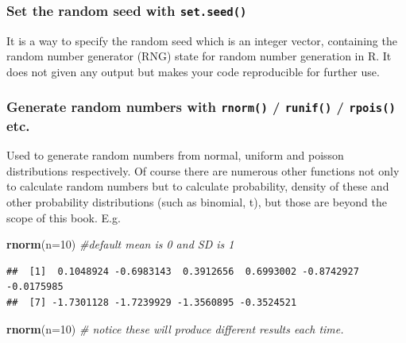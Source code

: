 \documentclass[
]{book}
\newenvironment{Shaded}{\begin{snugshade}}{\end{snugshade}}
\newcommand{\AttributeTok}[1]{\textcolor[rgb]{0.13,0.29,0.53}{#1}}
\newcommand{\CommentTok}[1]{\textcolor[rgb]{0.56,0.35,0.01}{\textit{#1}}}
\newcommand{\DecValTok}[1]{\textcolor[rgb]{0.00,0.00,0.81}{#1}}
\newcommand{\FunctionTok}[1]{\textcolor[rgb]{0.13,0.29,0.53}{\textbf{#1}}}
\newcommand{\NormalTok}[1]{#1}
\begin{document}
\hypertarget{set-the-random-seed-with-set.seed}{%
\subsubsection*{\texorpdfstring{Set the random seed with \texttt{set.seed()}}{Set the random seed with set.seed()}}\label{set-the-random-seed-with-set.seed}}

It is a way to specify the random seed which is an integer vector, containing the random number generator (RNG) state for random number generation in R. It does not given any output but makes your code reproducible for further use.

\hypertarget{generate-random-numbers-with-rnorm-runif-rpois-etc.}{%
\subsubsection*{\texorpdfstring{Generate random numbers with \texttt{rnorm()} / \texttt{runif()} / \texttt{rpois()} etc.}{Generate random numbers with rnorm() / runif() / rpois() etc.}}\label{generate-random-numbers-with-rnorm-runif-rpois-etc.}}

Used to generate random numbers from normal, uniform and poisson distributions respectively. Of course there are numerous other functions not only to calculate random numbers but to calculate probability, density of these and other probability distributions (such as binomial, t), but those are beyond the scope of this book. E.g.

\begin{Shaded}
\begin{Highlighting}[]
\FunctionTok{rnorm}\NormalTok{(}\AttributeTok{n=}\DecValTok{10}\NormalTok{) }\CommentTok{\#default mean is 0 and SD is 1}
\end{Highlighting}
\end{Shaded}

\begin{verbatim}
##  [1]  0.1048924 -0.6983143  0.3912656  0.6993002 -0.8742927 -0.0175985
##  [7] -1.7301128 -1.7239929 -1.3560895 -0.3524521
\end{verbatim}

\begin{Shaded}
\begin{Highlighting}[]
\FunctionTok{rnorm}\NormalTok{(}\AttributeTok{n=}\DecValTok{10}\NormalTok{) }\CommentTok{\# notice these will produce different results each time.}
\end{Highlighting}
\end{Shaded}
\end{document}
